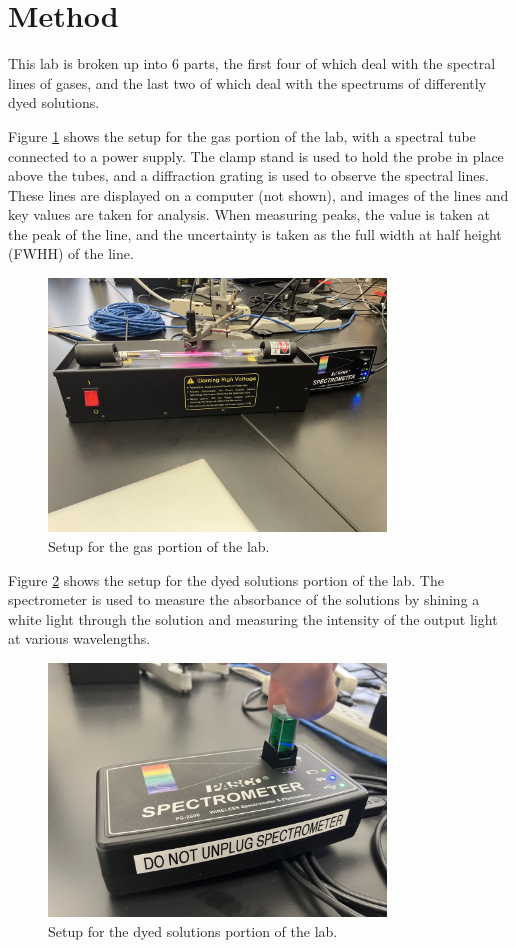 \section{Method}
This lab is broken up into 6 parts, the first four of which deal with the spectral lines of gases, and the last two of which deal with the spectrums of differently dyed solutions.

Figure \ref{fig:gas_setup} shows the setup for the gas portion of the lab, with a spectral tube connected to a power supply. The clamp stand is used to hold the probe in place above the tubes, and a diffraction grating is used to observe the spectral lines. These lines are displayed on a computer (not shown), and images of the lines and key values are taken for analysis. When measuring peaks, the value is taken at the peak of the line, and the uncertainty is taken as the full width at half height (FWHH) of the line.
\begin{figure}[H]
    \centering
    \includegraphics[width=0.8\textwidth]{method/gas_setup.jpg}
    \caption{Setup for the gas portion of the lab.}
    \label{fig:gas_setup}
\end{figure}

Figure \ref{fig:dye_setup} shows the setup for the dyed solutions portion of the lab. The spectrometer is used to measure the absorbance of the solutions by shining a white light through the solution and measuring the intensity of the output light at various wavelengths. 
\begin{figure}[H]
    \centering
    \includegraphics[width=0.8\textwidth]{method/solution_setup.jpg}
    \caption{Setup for the dyed solutions portion of the lab.}
    \label{fig:dye_setup}
\end{figure}

